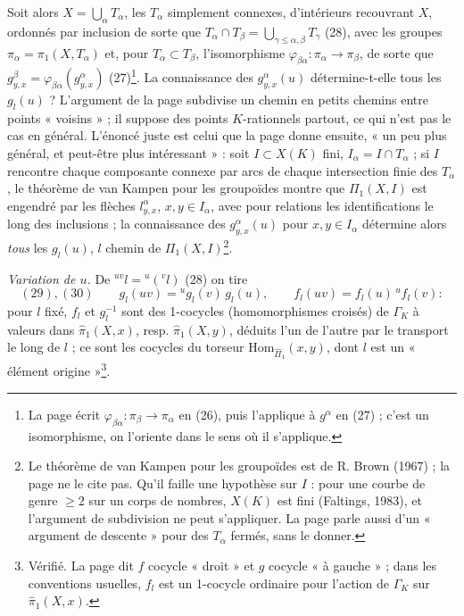 \documentclass[11pt,a4paper]{article}
\begin{document}
Soit alors $X = \bigcup_\alpha T_\alpha$, les $T_\alpha$ simplement connexes,
d'intérieurs recouvrant $X$, ordonnés par inclusion de sorte que $T_\alpha \cap
T_\beta = \bigcup_{\gamma \leq \alpha, \beta} T_\gamma$ (28), avec les groupes
$\pi_\alpha = \pi_1(X, T_\alpha)$ et, pour $T_\alpha \subset T_\beta$,
l'isomorphisme $\varphi_{\beta\alpha} : \pi_\alpha \to \pi_\beta$, de sorte que
$g^{\beta}_{y,x} = \varphi_{\beta\alpha}(g^{\alpha}_{y,x})$ (27)\footnote{La page
écrit $\varphi_{\beta\alpha} : \pi_\beta \to \pi_\alpha$ en (26), puis
l'applique à $g^{\alpha}$ en (27) ; c'est un isomorphisme, on l'oriente dans
le sens où il s'applique.}. La connaissance des $g^{\alpha}_{y,x}(u)$
détermine-t-elle tous les $g_l(u)$ ? L'argument de la page subdivise un chemin
en petits chemins entre points « voisins » ; il suppose des points
$K$-rationnels partout, ce qui n'est pas le cas en général. L'énoncé juste est
celui que la page donne ensuite, « un peu plus général, et peut-être plus
intéressant » : soit $I \subset X(K)$ fini, $I_\alpha = I \cap T_\alpha$ ; si
$I$ rencontre chaque composante connexe par arcs de chaque intersection finie
des $T_\alpha$, le théorème de van Kampen pour les groupoïdes montre que
$\Pi_1(X, I)$ est engendré par les flèches $l^{\alpha}_{y,x}$, $x, y \in
I_\alpha$, avec pour relations les identifications le long des inclusions ;
la connaissance des $g^{\alpha}_{y,x}(u)$ pour $x, y \in I_\alpha$ détermine
alors \emph{tous} les $g_l(u)$, $l$ chemin de $\Pi_1(X, I)$\footnote{Le
théorème de van Kampen pour les groupoïdes est de R. Brown (1967) ; la page ne
le cite pas. Qu'il faille une hypothèse sur $I$ : pour une courbe de genre
$\geq 2$ sur un corps de nombres, $X(K)$ est fini (Faltings, 1983), et
l'argument de subdivision ne peut s'appliquer. La page parle aussi d'un
« argument de descente » pour des $T_\alpha$ fermés, sans le donner.}.

\emph{Variation de $u$.} De ${}^{uv}l = {}^{u}({}^{v}l)$ (28) on tire
\[
(29),(30)\qquad g_l(uv) = {}^{u}g_l(v)\, g_l(u), \qquad f_l(uv) = f_l(u)\, {}^{u}f_l(v) :
\]
pour $l$ fixé, $f_l$ et $g_l^{-1}$ sont des 1-cocycles (homomorphismes
croisés) de $\Gamma_K$ à valeurs dans $\widehat\pi_1(X, x)$, resp.
$\widehat\pi_1(X, y)$, déduits l'un de l'autre par le transport le long de $l$
; ce sont les cocycles du torseur $\mathrm{Hom}_{\widehat\Pi_1}(x, y)$, dont $l$
est un « élément origine »\footnote{Vérifié. La page dit $f$ cocycle « droit »
et $g$ cocycle « à gauche » ; dans les conventions usuelles, $f_l$ est un
1-cocycle ordinaire pour l'action de $\Gamma_K$ sur $\widehat\pi_1(X, x)$.}.
\end{document}
